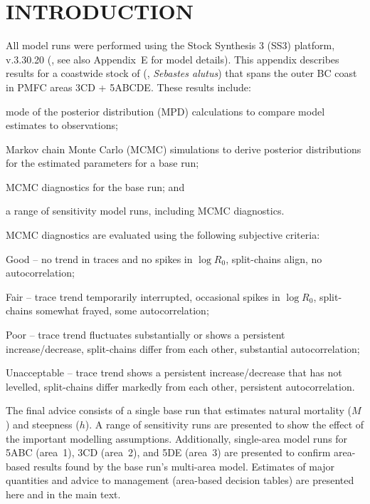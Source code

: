 \documentclass[11pt]{book}
\newcommand{\AppEqn}{Appendix~E}
\begin{document}
\section{INTRODUCTION}

All model runs were performed using the Stock Synthesis 3 (SS3) platform, v.3.30.20 (\citealt{Methot-etal:2022}, see also \AppEqn{} for model details).
This appendix describes results for a coastwide stock of \SPP{} (\SPC, \emph{Sebastes alutus}) that spans the outer BC coast in PMFC areas 3CD + 5ABCDE.
These results include:
\vspace{-0.5\baselineskip}
\begin{itemize_csas}{}{}
\item mode of the posterior distribution (MPD) calculations to compare model estimates to observations;
\item Markov chain Monte Carlo (MCMC) simulations to derive posterior distributions for the estimated parameters for a base run;
\item MCMC diagnostics for the base run; and
\item a range of sensitivity model runs, including MCMC diagnostics.
\end{itemize_csas}
MCMC diagnostics are evaluated using the following subjective criteria:
\begin{itemize_csas}{}{}
  \item Good -- no trend in traces and no spikes in $\log R_0$, split-chains align, no autocorrelation;
  \item Fair -- trace trend temporarily interrupted, occasional spikes in $\log R_0$, split-chains somewhat frayed, some autocorrelation;
  \item Poor -- trace trend fluctuates substantially or shows a persistent increase/decrease, split-chains differ from each other, substantial autocorrelation;
  \item Unacceptable -- trace trend shows a persistent increase/decrease that has not levelled, split-chains differ markedly from each other, persistent autocorrelation.
\end{itemize_csas}

The final advice consists of a single base run that estimates natural mortality ($M$) and steepness ($h$).
A range of sensitivity runs are presented to show the effect of the important modelling assumptions.
Additionally, single-area model runs for 5ABC (area~1), 3CD (area~2), and 5DE (area~3) are presented to confirm area-based results found by the base run's multi-area model.
Estimates of major quantities and advice to management (area-based decision tables) are presented here and in the main text.
\end{document}
